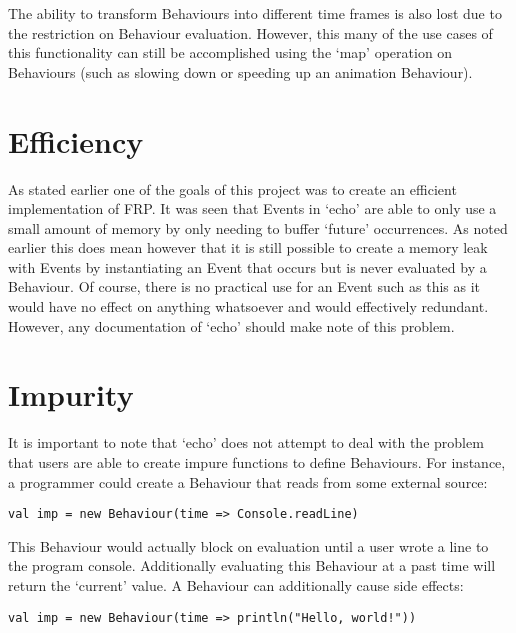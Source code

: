    The ability to transform Behaviours into different time frames is also lost due to the restriction on Behaviour
    evaluation. However, this many of the use cases of this functionality can still be accomplished using the
    `map' operation on Behaviours (such as slowing down or speeding up an animation Behaviour).
    
  \section{Efficiency}
    As stated earlier one of the goals of this project was to create an efficient implementation
    of FRP. It was seen that Events in `echo' are able to only use a small amount of memory by only
    needing to buffer `future' occurrences. As noted earlier this does mean however that it is still
    possible to create a memory leak with Events by instantiating an Event that occurs but is never 
    evaluated by a Behaviour. Of course, there is no practical use for an Event such as this as
    it would have no effect on anything whatsoever and would effectively redundant. However, any documentation
    of `echo' should make note of this problem.
    
  
  \section{Impurity}
    It is important to note that `echo' does not attempt to deal with the problem that
    users are able to create impure functions to define Behaviours. For instance, a programmer could
    create a Behaviour that reads from some external source:

\begin{verbatim}
val imp = new Behaviour(time => Console.readLine)
\end{verbatim}    

    This Behaviour would actually block on evaluation until a user wrote a line to the program console. 
    Additionally evaluating this Behaviour at a past time will return the `current' value. A
    Behaviour can additionally cause side effects:

\begin{verbatim}    
val imp = new Behaviour(time => println("Hello, world!"))
\end{verbatim}

